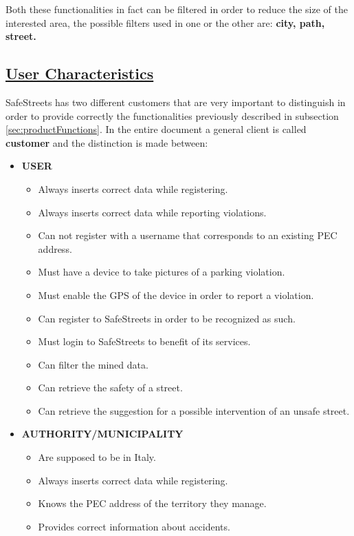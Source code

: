 	 	Both these functionalities in fact can be filtered in order to reduce the size of the interested area, the possible filters used in one or the other are: \textbf{city, path, street.}
		
\subsection[User Characteristics]{\hyperlink{toc}{User Characteristics}}
	\label{sec:userCharacteristics}
	SafeStreets has two different customers that are very important to distinguish in order to provide correctly the functionalities previously described in subsection \ref{sec:productFunctions}. In the entire document a general client is called \textbf{customer} and the distinction is made between:
	
	\begin{itemize}
		\item \textbf{USER}
			\begin{itemize}
				\item Always inserts correct data while registering.
				\item Always inserts correct data while reporting violations.
				\item Can not register with a username that corresponds to an existing PEC address.
				\item Must have a device to take pictures of a parking violation.
				\item Must enable the GPS of the device in order to report a violation.
				\item Can register to SafeStreets in order to be recognized as such.
				\item Must login to SafeStreets to benefit of its services.
				\item Can filter the mined data.
				\item Can retrieve the safety of a street.
				\item Can retrieve the suggestion for a possible intervention of an unsafe street.
			\end{itemize}
		\item \textbf{AUTHORITY/MUNICIPALITY}
			\begin{itemize}
				\item Are supposed to be in Italy.
				\item Always inserts correct data while registering.
				\item Knows the PEC address of the territory they manage.
				\item Provides correct information about accidents.

\end{itemize}
\end{itemize}
